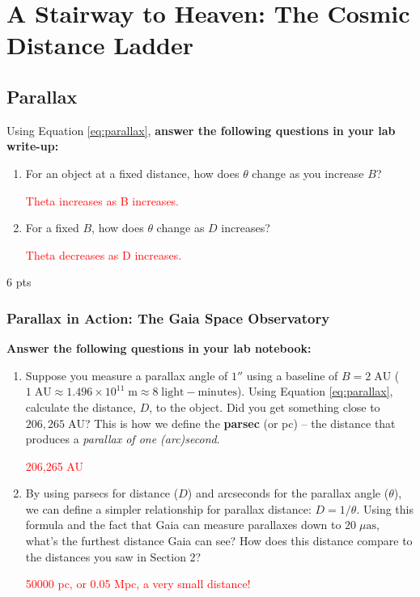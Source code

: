 \documentclass[11pt]{article}
\begin{document}
\section{A Stairway to Heaven: The Cosmic Distance Ladder}

\subsection{Parallax}

\medskip \noindent
Using Equation \ref{eq:parallax}, \textbf{answer the following questions in your lab write-up:}

\begin{enumerate}
    \item [3 pts] For an object at a fixed distance, how does $\theta$ change as you increase $B$? 
    
    \textcolor{red}{Theta increases as B increases.}
    
    \item [3 pts] For a fixed $B$, how does $\theta$ change as $D$ increases?
    
    \textcolor{red}{Theta decreases as D increases.}
\end{enumerate}

6 pts


\subsubsection{Parallax in Action: The Gaia Space Observatory}

\medskip \noindent
\textbf{Answer the following questions in your lab notebook:}

\begin{enumerate}[resume]
    \item [4 pts] Suppose you measure a parallax angle of $1''$ using a baseline of $B=2\;\mathrm{AU}$ ($1\;\mathrm{AU} \approx 1.496\times 10^{11}\;\mathrm{m} \approx 8\;\mathrm{light{-}minutes}$). Using Equation \ref{eq:parallax}, calculate the distance, $D$, to the object. Did you get something close to $206,265\;\mathrm{AU}$? This is how we define the \textbf{parsec} (or pc) -- the distance that produces a \emph{parallax of one (arc)second}.
    
    \textcolor{red}{206,265 AU}
    
    \item [10 pts] By using parsecs for distance ($D$) and arcseconds for the parallax angle ($\theta$), we can define a simpler relationship for parallax distance: $D = 1/\theta$. Using this formula and the fact that Gaia can measure parallaxes down to $20\;\mu\mathrm{as}$, what's the furthest distance Gaia can see? How does this distance compare to the distances you saw in Section 2? 
    
    \textcolor{red}{50000 pc, or 0.05 Mpc, a very small distance!}
\end{enumerate}
\end{document}
